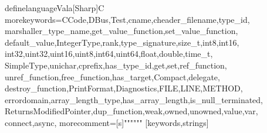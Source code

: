 %
\lst definelanguage{Vala}[Sharp]{C}%
  {morekeywords={CCode,DBus,Test,cname,cheader_filename,type_id,%
      marshaller_type_name,get_value_function,set_value_function,%
      default_value,IntegerType,rank,type_signature,size_t,int8,int16,%
      int32,uint32,uint16,uint8,int64,uint64,float,double,time_t,%
      SimpleType,unichar,cprefix,has_type_id,get,set,ref_function,%
      unref_function,free_function,has_target,Compact,delegate,%
      destroy_function,PrintFormat,Diagnostics,FILE,LINE,METHOD,%
      errordomain,array_length_type,has_array_length,is_null_terminated,%
      ReturnsModifiedPointer,dup_function,weak,owned,unowned,value,var,%
      connect,async},%
    morecomment=[s]{"""}{"""}
    }[keywords,strings]
    
